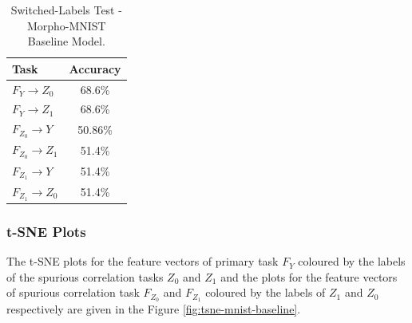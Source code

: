 \documentclass[12pt,DIV14,BCOR12mm,a4paper,footinclude=false,headinclude,parskip=half-,twoside,openright,cleardoublepage=empty,toc=index,bibliography=totoc,listof=totoc]{scrreprt}
\numberwithin{equation}{chapter}
\begin{document}
\begin{table}[H]
\centering
\begin{tabular}{|l|c|}
\hline
\textbf{Task} & \textbf{Accuracy} \\
\hline
$F_Y \rightarrow Z_0$& 68.6\%\\
$F_Y \rightarrow Z_1$ & 68.6\%\\
\hline
$F_{Z_0} \rightarrow Y$& 50.86\%\\
$F_{Z_0} \rightarrow Z_1$ & 51.4\%\\
\hline
$F_{Z_1} \rightarrow Y$& 51.4\%\\
$F_{Z_1} \rightarrow Z_0$& 51.4\%\\
\hline
\end{tabular}
\caption{Switched-Labels Test - Morpho-MNIST Baseline Model.}
\label{tab:accuracy_tasks-mmnist_baseline}
\end{table}

\subsubsection{t-SNE Plots}
The t-SNE plots for the feature vectors of primary task $F_Y$ coloured by the labels of the spurious correlation tasks $Z_0$ and $Z_1$ and the plots for the feature vectors of spurious correlation task $F_{Z_0}$ and $F_{Z_1}$ coloured by the labels of $Z_1$ and $Z_0$ respectively are given in the Figure \ref{fig:tsne-mnist-baseline}.
\end{document}
